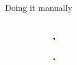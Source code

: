 \documentclass{beamer}
\begin{document}
\begin{frame}{Doing it manually}
\begin{columns}
\begin{column}{0.85\textwidth}
\begin{figure}
\begin{subfigure}[b]{0.22\textwidth}
      \end{subfigure}
      \begin{subfigure}[b]{0.22\textwidth}
          \includegraphics[width=\textwidth]{figures/manual_filters/edge_5.png}
      \end{subfigure}
      \begin{subfigure}[b]{0.22\textwidth}
          \includegraphics[width=\textwidth]{figures/manual_filters/edge_7.png}
      \end{subfigure}
      

\end{figure}
\end{column}
\end{columns}
\end{frame}
\end{document}
